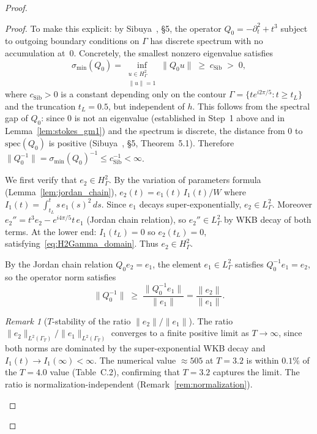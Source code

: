\documentclass[12pt,a4paper]{amsart}
\theoremstyle{remark}
\newtheorem{remark}[theorem]{Remark}
\begin{document}
\begin{proof}
\begin{proof}
To make this explicit: by Sibuya~\cite{Sibuya75}, \S5, the operator
$Q_0 = -\partial_t^2 + t^3$ subject to outgoing boundary conditions on $\Gamma$
has discrete spectrum with no accumulation at~$0$.
Concretely, the smallest nonzero eigenvalue satisfies
\begin{equation}\label{eq:sigma_min_Sibuya}
  \sigma_{\min}(Q_0) = \inf_{\substack{u \in H^2_\Gamma \\ \|u\|=1}} \|Q_0 u\|
  \;\geq\; c_{\mathrm{Sib}} \;>\; 0,
\end{equation}
where $c_{\mathrm{Sib}} > 0$ is a constant depending only on the contour
$\Gamma = \{te^{i2\pi/5}: t \geq t_L\}$ and the truncation $t_L = 0.5$,
but independent of $h$.
This follows from the spectral gap of $Q_0$: since $0$ is not an eigenvalue
(established in Step~1 above and in Lemma~\ref{lem:stokes_gm1}) and the
spectrum is discrete, the distance from $0$ to $\mathrm{spec}(Q_0)$ is
positive (Sibuya~\cite{Sibuya75}, \S5, Theorem~5.1).
Therefore $\|Q_0^{-1}\| = \sigma_{\min}(Q_0)^{-1} \leq c_{\mathrm{Sib}}^{-1} < \infty$.

We first verify that $e_2 \in H^2_\Gamma$.
By the variation of parameters formula (Lemma~\ref{lem:jordan_chain}),
$e_2(t) = e_1(t)\,I_1(t)/W$ where $I_1(t) = \int_{t_L}^t s\,e_1(s)^2\,ds$.
Since $e_1$ decays super-exponentially, $e_2 \in L^2_\Gamma$.
Moreover $e_2'' = t^3 e_2 - e^{i4\pi/5}t\,e_1$ (Jordan chain relation),
so $e_2'' \in L^2_\Gamma$ by WKB decay of both terms.
At the lower end: $I_1(t_L) = 0$ so $e_2(t_L) = 0$,
satisfying~\eqref{eq:H2Gamma_domain}. Thus $e_2 \in H^2_\Gamma$.

By the Jordan chain relation $Q_0 e_2 = e_1$,
the element $e_1 \in L^2_\Gamma$ satisfies $Q_0^{-1} e_1 = e_2$,
so the operator norm satisfies
\begin{equation}\label{eq:Q0inv_upper}
  \|Q_0^{-1}\|
  \;\geq\; \frac{\|Q_0^{-1} e_1\|}{\|e_1\|}
  = \frac{\|e_2\|}{\|e_1\|}.
\end{equation}

\begin{remark}[$T$-stability of the ratio $\|e_2\|/\|e_1\|$]
\label{rem:ratio_T_indep}
The ratio $\|e_2\|_{L^2(\Gamma_T)}/\|e_1\|_{L^2(\Gamma_T)}$ converges to a
finite positive limit as $T\to\infty$, since both norms are dominated by the
super-exponential WKB decay and $I_1(t) \to I_1(\infty) < \infty$.
The numerical value $\approx 505$ at $T = 3.2$ is within $0.1\%$ of the
$T = 4.0$ value (Table~C.2), confirming that $T = 3.2$ captures the limit.
The ratio is normalization-independent (Remark~\ref{rem:normalization}).
\end{remark}
\end{proof}


\end{proof}
\end{document}
